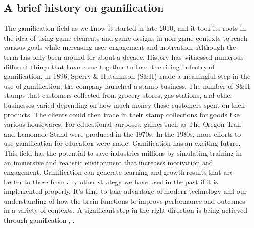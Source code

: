 \documentclass[../main.tex]{subfiles}
\begin{document}
\subsection{A brief history on gamification}
The gamification field as we know it started in late 2010, and it took its roots in the idea of using game elements and game designs in non-game contexts to reach various goals while increasing user engagement and motivation. Although the term has only been around for about a decade. History has witnessed numerous different things that have come together to form the rising industry of gamification. 
In 1896, Sperry \& Hutchinson (S\&H) made a meaningful step in the use of gamification; the company launched a stamp business. The number of S\&H stamps that customers collected from grocery stores, gas stations, and other businesses varied depending on how much money those customers spent on their products. The clients could then trade in their stamp collections for goods like various housewares. For educational purposes, games such as The Oregon Trail and Lemonade Stand were produced in the 1970s. In the 1980s, more efforts to use gamification for education were made. 
Gamification has an exciting future. This field has the potential to save industries millions by simulating training in an immersive and realistic environment that increases motivation and engagement. Gamification can generate learning and growth results that are better to those from any other strategy we have used in the past if it is implemented properly. It's time to take advantage of modern technology and our understanding of how the brain functions to improve performance and outcomes in a variety of contexts. A significant step in the right direction is being achieved through gamification \cite{6}, \cite{7}.
\end{document}
